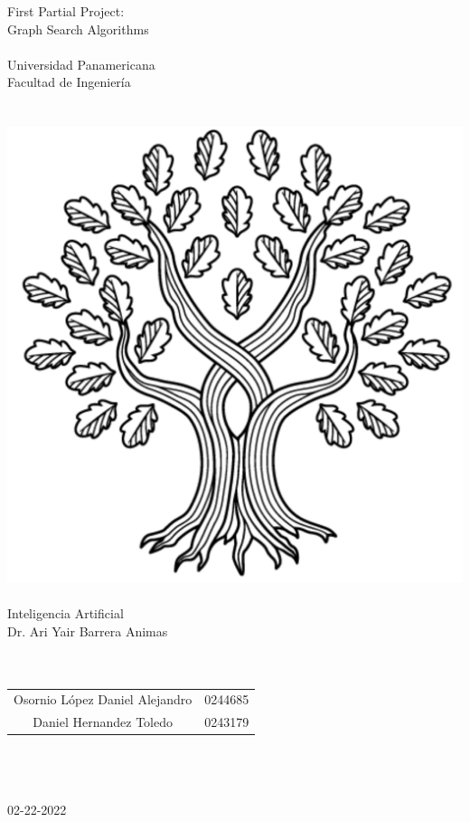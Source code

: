 
\hspace{0pt}
\vfill


\begin{center}
    {\huge First Partial Project:\\Graph Search Algorithms}\\    \quad\\
    {\large Universidad Panamericana}\\
    {\large Facultad de Ingeniería}\\
    \quad\\
    \quad\\
    \includegraphics[scale=0.3]{../img/UP}
    \quad\\
    \quad\\
    Inteligencia Artificial\\
    Dr. Ari Yair Barrera Animas\\
    \quad\\
    \quad\\
    \begin{tabular}{c|c}
        Osornio López Daniel Alejandro & 0244685\\
		Daniel Hernandez Toledo & 0243179\\
    \end{tabular}\\
    \quad\\
    \quad\\
	02-22-2022
\end{center}

